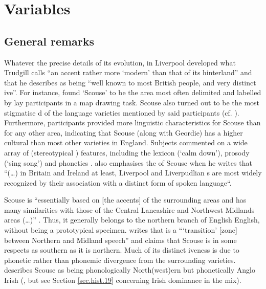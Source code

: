 \chapter{Variables}
\label{ch.var}

	\section{General remarks}\label{sec.var.general}

Whatever the precise details of its evolution, in Liverpool developed what Trudgill calls ``an accent rather more `modern' than that of its hinterland'' \citep[70]{trudgill1999} and that he describes as being ``well known to most British people, and very distinct ive''.
For instance, \textcite{montgomery2007} found `Scouse' to be the  area most often delimited and labelled by lay participants in a map drawing task.
Scouse also turned out to be the most stigmatise d of the language varieties mentioned by said participants (cf. \cite[194 and 254]{montgomery2007}).
Furthermore, participants provided more linguistic characteristics for Scouse than for any other  area, indicating that Scouse (along with Geordie) has a higher cultural  than most other varieties in England.
Subjects commented on a wide array of (stereotypical ) features, including the lexicon (`calm down'), prosody (`sing song') and phonetics \citep[cf.][180--181]{montgomery2007a}.
\textcite[15]{crowley2012} also emphasises the  of Scouse when he writes that ``(\dots) in Britain and Ireland at least, Liverpool and Liverpudlian s are most widely recognized by their association with a distinct  form of spoken language``.

Scouse is ``essentially based on [the accents] of the surrounding areas and has many similarities with those of the Central Lancashire and Northwest Midlands areas (\dots)'' \citep[70]{trudgill1999}.
Thus, it generally belongs to the northern branch of English English, without being a prototypical specimen.
\citet[18]{wales2006} writes that  is a ```transition' [zone] between Northern and Midland  speech'' and \citet[72]{trudgill1999} claims that Scouse is in some respects as southern as it is northern.
Much of its distinct iveness is due to phonetic rather than phonemic divergence from the surrounding varieties. \textcite{knowles1973} describes Scouse as being phonologically North(west)ern but phonetically Anglo Irish (\citealt[cf. also][80]{knowles1978}, but see Section \ref{sec.hist.19} concerning Irish dominance in the  mix).

